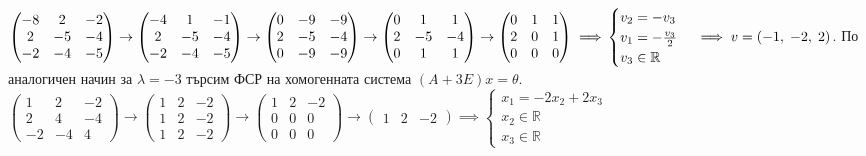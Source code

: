 \documentclass[12pt]{article}
\newcommand{\R}{\mathbb{R}}
\begin{document}
$\begin{pmatrix}
    -8 &  2 & -2 \\
     2 & -5 & -4 \\
    -2 & -4 & -5
\end{pmatrix} \to \begin{pmatrix}
    -4 &  1 & -1 \\
     2 & -5 & -4 \\
    -2 & -4 & -5
\end{pmatrix} \to \begin{pmatrix}
    0 & -9 & -9 \\
    2 & -5 & -4 \\
    0 & -9 & -9
\end{pmatrix} \to \begin{pmatrix}
    0 &  1 &  1 \\
    2 & -5 & -4 \\
    0 &  1 &  1
\end{pmatrix} \to \begin{pmatrix}
    0 & 1 &  1 \\
    2 & 0 &  1 \\
    0 & 0 &  0
\end{pmatrix} \implies \\\\
\begin{cases}
    v_2 = -v_3 \\
    v_1 = -\frac{v_3}{2} \\
    v_3 \in \R
\end{cases} \implies v = (-1, \; -2, \; 2)$. По аналогичен начин за $\lambda = -3$ търсим ФСР на хомогенната система $(A  + 3E)x = \theta$. \\

$\begin{pmatrix}
     1 &  2 & -2 \\
     2 &  4 & -4 \\
    -2 & -4 &  4
\end{pmatrix} \to \begin{pmatrix}
    1 & 2 & -2 \\
    1 & 2 & -2 \\
    1 & 2 & -2
\end{pmatrix} \to \begin{pmatrix}
    1 & 2 & -2 \\
    0 & 0 &  0 \\
    0 & 0 &  0
\end{pmatrix} \to \begin{pmatrix}
    1 & 2 & -2
\end{pmatrix} \implies \begin{cases}
    x_1 = -2x_2 + 2x_3 \\
    x_2 \in \R \\
    x_3 \in \R
\end{cases}$ \\
\end{document}

